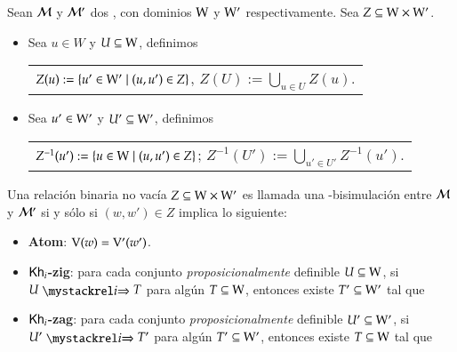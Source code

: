 \begin{definicion}\label{def:bisimulation}
    Sean $\mathcal{M}$ y $\mathcal{M}'$ dos \ultss, con dominios $\mathrm{W}$ y $\mathrm{W}'$ respectivamente. Sea $Z \subseteq \mathrm{W} \times \mathrm{W}'$.
    \begin{itemize}
        \item Sea $u \in W$ y $U \subseteq \mathrm{W}$, definimos
        \begin{nscenter}
            \begin{tabular}{@{}c@{}}
                $Z(u) := \{ u' \in \mathrm{W}' \mid (u,u') \in Z \}$, \qquad $Z(U) := \bigcup_{u \in U} Z(u)$.
            \end{tabular}
        \end{nscenter}
        \item Sea $u' \in \mathrm{W}'$ y $U' \subseteq \mathrm{W}'$, definimos
        \begin{nscenter}
            \begin{tabular}{@{}c@{}}
                $Z^{-1}(u') := \{ u \in \mathrm{W} \mid (u,u') \in Z \}$; \qquad $Z^{-1}(U') := \bigcup_{u' \in U'} Z^{-1}(u')$.
            \end{tabular}
        \end{nscenter}
    \end{itemize}

    Una relación binaria no vacía $Z \subseteq \mathrm{W} \times \mathrm{W}'$ es llamada una \KHilogic-bisimulación entre $\mathcal{M}$ y 
    $\mathcal{M}'$ si y sólo si $(w,w') \in Z$ implica lo siguiente:
    \begin{itemize}
        \item \textbf{Atom}: $\mathrm{V}(w)=\mathrm{V}'(w')$.

        \item \textbf{$\mathsf{Kh}_i$-zig}: para cada conjunto \emph{proposicionalmente} definible $U \subseteq \mathrm{W}$, si $U \ultsExecAgi T$ para algún $T \subseteq \mathrm{W}$, entonces existe $T' \subseteq \mathrm{W}'$ tal que
        \begin{multicols}{2}
        \end{multicols}
        
        \item \textbf{$\mathsf{Kh}_i$-zag}: para cada conjunto \emph{proposicionalmente} definible $U' \subseteq \mathrm{W}'$, si $U' \ultsExecAgi T'$ para algún $T' \subseteq \mathrm{W}'$, entonces existe $T \subseteq \mathrm{W}$ tal que
        \begin{multicols}{2}
        \end{multicols}


\end{itemize}
\end{definicion}
